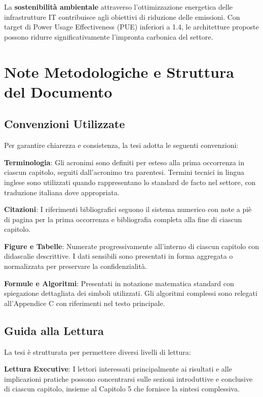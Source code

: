 La \textbf{sostenibilità ambientale} attraverso l'ottimizzazione energetica delle infrastrutture IT contribuisce agli obiettivi di riduzione delle emissioni. Con target di Power Usage Effectiveness (PUE) inferiori a 1.4, le architetture proposte possono ridurre significativamente l'impronta carbonica del settore.

\section{Note Metodologiche e Struttura del Documento}

\subsection{Convenzioni Utilizzate}

Per garantire chiarezza e consistenza, la tesi adotta le seguenti convenzioni:

\textbf{Terminologia}: Gli acronimi sono definiti per esteso alla prima occorrenza in ciascun capitolo, seguiti dall'acronimo tra parentesi. Termini tecnici in lingua inglese sono utilizzati quando rappresentano lo standard de facto nel settore, con traduzione italiana dove appropriata.

\textbf{Citazioni}: I riferimenti bibliografici seguono il sistema numerico con note a piè di pagina per la prima occorrenza e bibliografia completa alla fine di ciascun capitolo.

\textbf{Figure e Tabelle}: Numerate progressivamente all'interno di ciascun capitolo con didascalie descrittive. I dati sensibili sono presentati in forma aggregata o normalizzata per preservare la confidenzialità.

\textbf{Formule e Algoritmi}: Presentati in notazione matematica standard con spiegazione dettagliata dei simboli utilizzati. Gli algoritmi complessi sono relegati all'Appendice C con riferimenti nel testo principale.

\subsection{Guida alla Lettura}

La tesi è strutturata per permettere diversi livelli di lettura:

\textbf{Lettura Executive}: I lettori interessati principalmente ai risultati e alle implicazioni pratiche possono concentrarsi sulle sezioni introduttive e conclusive di ciascun capitolo, insieme al Capitolo 5 che fornisce la sintesi complessiva.

